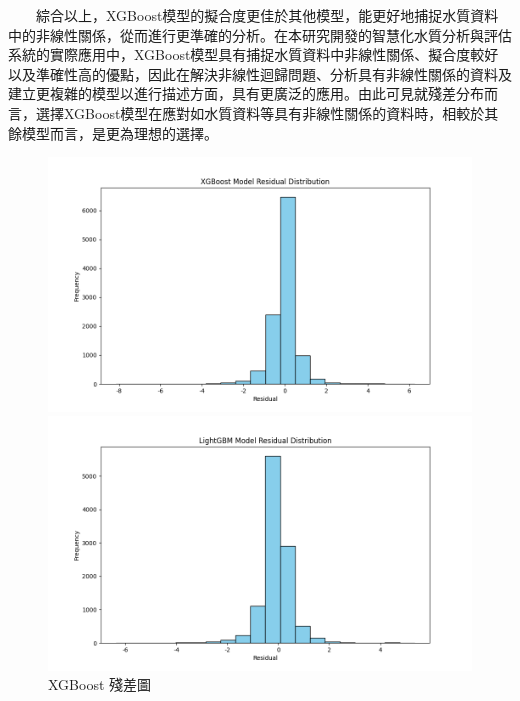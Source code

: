 \documentclass[12pt,a4paper]{article}
\begin{document}
\begin{enumerate}
\begin{enumerate}[label=\arabic*.]
\begin{enumerate}[label=3-2-\arabic*.]
\begin{enumerate}[label=\Alph*.]
                　　綜合以上，XGBoost模型的擬合度更佳於其他模型，能更好地捕捉水質資料中的非線性關係，從而進行更準確的分析。在本研究開發的智慧化水質分析與評估系統的實際應用中，XGBoost模型具有捕捉水質資料中非線性關係、擬合度較好以及準確性高的優點，因此在解決非線性迴歸問題、分析具有非線性關係的資料及建立更複雜的模型以進行描述方面，具有更廣泛的應用。由此可見就殘差分布而言，選擇XGBoost模型在應對如水質資料等具有非線性關係的資料時，相較於其餘模型而言，是更為理想的選擇。
                     \begin{figure}[H]
                        \centering
                        \begin{minipage}[t]{0.4\textwidth}
                            \centering
                            \includegraphics[width=\textwidth]{resources/image/ResidualPlot/XGBoost.png}
                            \caption{XGBoost 殘差圖}
                            \label{fig:residual_xgboost}
                        \end{minipage}
                        \hspace{0.001\textwidth}
                        \begin{minipage}[t]{0.4\textwidth}
                            \centering
                            \includegraphics[width=\textwidth]{resources/image/ResidualPlot/LightGBM.png}

\end{minipage}
\end{figure}
\end{enumerate}
\end{enumerate}
\end{enumerate}
\end{enumerate}
\end{document}
